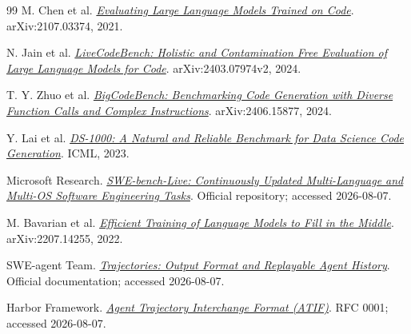 \documentclass[10pt,a4paper,UTF8,fontset=none]{ctexart}
\begin{document}
\begin{thebibliography}{99}
M. Chen et al. \href{https://arxiv.org/abs/2107.03374}{\textit{Evaluating Large Language Models Trained on Code}}. arXiv:2107.03374, 2021.

N. Jain et al. \href{https://arxiv.org/abs/2403.07974}{\textit{LiveCodeBench: Holistic and Contamination Free Evaluation of Large Language Models for Code}}. arXiv:2403.07974v2, 2024.

T. Y. Zhuo et al. \href{https://arxiv.org/abs/2406.15877}{\textit{BigCodeBench: Benchmarking Code Generation with Diverse Function Calls and Complex Instructions}}. arXiv:2406.15877, 2024.

Y. Lai et al. \href{https://arxiv.org/abs/2211.11501}{\textit{DS-1000: A Natural and Reliable Benchmark for Data Science Code Generation}}. ICML, 2023.

Microsoft Research. \href{https://github.com/microsoft/SWE-bench-Live}{\textit{SWE-bench-Live: Continuously Updated Multi-Language and Multi-OS Software Engineering Tasks}}. Official repository; accessed 2026-08-07.

M. Bavarian et al. \href{https://arxiv.org/abs/2207.14255}{\textit{Efficient Training of Language Models to Fill in the Middle}}. arXiv:2207.14255, 2022.

SWE-agent Team. \href{https://github.com/SWE-agent/SWE-agent/blob/main/docs/usage/trajectories.md}{\textit{Trajectories: Output Format and Replayable Agent History}}. Official documentation; accessed 2026-08-07.

Harbor Framework. \href{https://github.com/harbor-framework/harbor/blob/main/rfcs/0001-trajectory-format.md}{\textit{Agent Trajectory Interchange Format (ATIF)}}. RFC 0001; accessed 2026-08-07.

\end{thebibliography}
\end{document}
